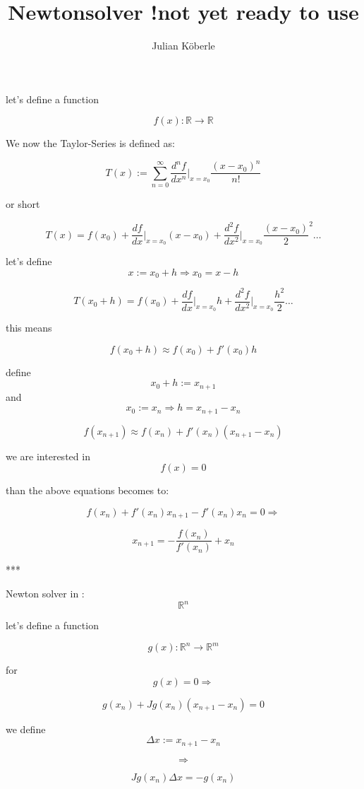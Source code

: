 \documentclass[10pt,a4paper]{article}
\begin{document}
\title{Newtonsolver !not yet ready to use}
\author{Julian Köberle}

\maketitle



let's define a function

$$f(x) : \mathbb{R} \rightarrow \mathbb{R}$$

We now the Taylor-Series is defined as:

$$ T(x) := \sum_{n=0}^{\infty} \frac{d^nf}{dx^n} \vert_{x=x_0}^{} \frac{(x-x_0)^n}{n!}$$

or short

$$T(x) = f(x_0)+\frac{df}{dx}\vert_{x=x_0}^{} (x-x_0) + \frac{d^2f}{dx^2}\vert_{x=x_0}^{} \frac{(x-x_0)}{2}^2 \dots$$

let's define $$x := x_0 + h \Rightarrow x_0 = x-h$$


$$T(x_0+h) = f(x_0)+\frac{df}{dx}\vert_{x=x_0}^{} h + \frac{d^2f}{dx^2}\vert_{x=x_0}^{} \frac{h^2}{2} \dots$$

this means

$$f(x_0+h) \approx f(x_0)+ f'(x_0)h$$

define  $$x_0+h := x_{n+1}$$ and $$x_0 := x_n \Rightarrow h= x_{n+1}-x_n$$

$$f(x_{n+1}) \approx f(x_n)+ f'(x_n) (x_{n+1}-x_n)$$

we are interested in $$f(x)=0$$ 

than the above equations becomes to:

$$f(x_n)+ f'(x_n)x_{n+1} -f'(x_n)x_n = 0 \Rightarrow$$

$$x_{n+1}  = - \frac{f(x_n)}{f'(x_n)} + x_n$$

***

Newton solver in : $$\mathbb{R}^n$$

let's define a function

$$g(x) : \mathbb{R}^n \rightarrow \mathbb{R}^m$$

for $$g(x)=0 \Rightarrow$$

$$g(x_n)+ Jg(x_n) (x_{n+1}-x_n) = 0$$

we define $$\Delta x := x_{n+1}-x_n$$

$$\Rightarrow$$

$$Jg(x_n)\Delta x = -g(x_n)$$
\end{document}
